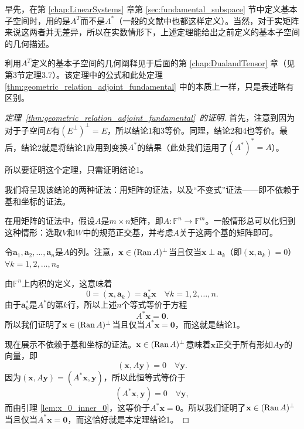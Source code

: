\begin{remark*}
    早先，在第 \ref{chap:LinearSystems} 章第 \ref{sec:fundamental_subspace} 节中定义基本子空间时，用的是$A^T$而不是$A^*$（一般的文献中也都这样定义）。当然，对于实矩阵来说这两者并无差异，所以在实数情形下，上述定理能给出之前定义的基本子空间的几何描述。

    利用$A^T$定义的基本子空间的几何阐释见于后面的第 \ref{chap:DualandTensor} 章（见第3节定理3.7）。该定理中的公式和此处定理 \ref{thm:geometric_relation_adjoint_fundamental} 中的本质上一样，只是表述略有区别。
\end{remark*}

\begin{proof}[定理~\ref{thm:geometric_relation_adjoint_fundamental}~的证明]
    首先，注意到因为对于子空间$E$有$(E^\perp)^\perp = E$，所以结论1和3等价。同理，结论2和4也等价。最后，结论2就是将结论1应用到变换$A^*$的结果（此处我们运用了$(A^*)^*=A$）。

    所以要证明这个定理，只需证明结论1。

    我们将呈现该结论的两种证法：用矩阵的证法，以及“不变式”证法——即不依赖于基和坐标的证法。

    在用矩阵的证法中，假设$A$是$m\times n$矩阵，即$A:\mathbb{F}^n\to \mathbb{F}^m$。一般情形总可以化归到这种情形：选取$V$和$W$中的规范正交基，并考虑$A$关于这两个基的矩阵即可。

    令$\mathbf{a}_{1},\mathbf{a}_{2},\ldots,\mathbf{a}_{n}$是$A$的列。注意，$\mathbf{x}\in(\operatorname{Ran} A)^\perp$当且仅当$\mathbf{x}\perp \mathbf{a}_{k}$（即$(\mathbf{x}, \mathbf{a}_{k})=0$）$\forall k=1,2,\dots,n$。

    由$\mathbb{F}^n$上内积的定义，这意味着\[0=(\mathbf{x},\mathbf{a}_k)=\mathbf{a}_k^*\mathbf{x}\quad\forall k=1,2,\ldots,n.\]
    由于$\mathbf{a}_k^*$是$A^*$的第$k$行，所以上述$n$个等式等价于方程\[A^*\mathbf{x}=\mathbf{0}.\]
    所以我们证明了$\mathbf{x}\in(\operatorname{Ran} A)^\perp$当且仅当$A^*\mathbf{x}=\mathbf{0}$，而这就是结论1。

    现在展示不依赖于基和坐标的证法。$\mathbf{x}\in(\operatorname{Ran} A)^\perp$意味着$\mathbf{x}$正交于所有形如$A\mathbf{y}$的向量，即\[(\mathbf{x},A\mathbf{y})=0\quad\forall\mathbf{y}.\]
    因为$(\mathbf{x},A\mathbf{y})=(A^*\mathbf{x},\mathbf{y})$，所以此恒等式等价于\[(A^*\mathbf{x},\mathbf{y})=0\quad\forall\mathbf{y},\]
    而由引理 \ref{lem:x_0_inner_0}，这等价于$A^*\mathbf{x}=\mathbf{0}$。所以我们证明了$\mathbf{x}\in(\operatorname{Ran} A)^\perp$当且仅当$A^*\mathbf{x}=\mathbf{0}$，而这恰好就是本定理结论1。
\end{proof}

